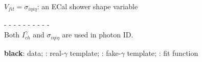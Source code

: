 \begin{frame}
\begin{minipage}[t]{0.49\textwidth}
\begin{figure}[htb]
\begin{center}
    \end{center}
  \end{figure}
    \begin{center}
      \tiny
      $V_{fit}=\sigma_{i\eta i\eta}$: an ECal shower shape variable\\
    \end{center}
\end{minipage} 

\begin{center}
\tiny
- - - - - - - - - - \\
Both $I_{ch}^{\gamma}$ and $\sigma_{i\eta i\eta}$ are used in photon ID.\\
\end{center}
{\bfseries{black}}: data; {\bfseries\color{green}{green}}: real-$\gamma$ template; {\bfseries\color{blue}{blue}}: fake-$\gamma$ template; {\bfseries\color{red}{red}}: fit function
\end{frame}

